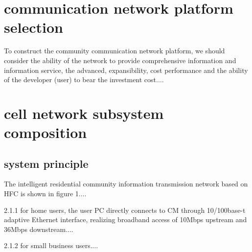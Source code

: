 \chapter{communication network platform selection}

To construct the community communication network platform, we should consider the ability of the network to provide comprehensive information and information service, the advanced, expansibility, cost performance and the ability of the developer (user) to bear the investment cost.$\dots$\par

\chapter{cell network subsystem composition}

\section{system principle}

The intelligent residential community information transmission network based on HFC is shown in figure 1.$\dots$\par

2.1.1 for home users, the user PC directly connects to CM through 10/100base-t adaptive Ethernet interface, realizing broadband access of 10Mbps upstream and 36Mbps downstream.$\dots$ \par

2.1.2 for small business users.$\dots$ \par
